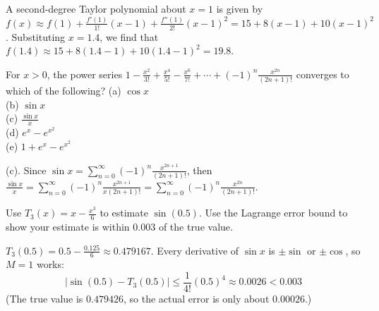 \begin{Answer}[ref=taylor2] A second-degree Taylor polynomial about $x = 1$ is given by $f(x) \approx f(1) 
+ \frac{f'(1)}{1!}(x - 1) + \frac{f''(1)}{2!}(x - 1)^2 = 15 + 8(x - 1) + 10(x 
- 1)^2$. Substituting $x = 1.4$, we find that $f(1.4) \approx 15 + 8(1.4 - 1) 
+ 10(1.4 - 1)^2 = 19.8$.
\end{Answer}

\begin{Exercise} For $x > 0$, the power series $1 - 
\frac{x^2}{3!} + \frac{x^4}{5!} - \frac{x^6}{7!} + \cdots + (-1)^n \frac{x^{2n}}{(2n + 1)!}$ converges to which of the following?
(a) $\cos{x}$\\
(b) $\sin{x}$\\
(c) $\frac{\sin{x}}{x}$\\
(d) $e^x - e^{x^2}$\\
(e) $1 + e^x - e^{x^2}$
\end{Exercise}

\begin{Answer}[ref=mac2] (c). Since $\sin{x} = \sum_{n=0}^\infty (-1)^n \frac{x^{2n + 1}}{(2n + 1)!}$, 
then $\frac{\sin{x}}{x} = \sum_{n = 0}^\infty (-1)^n \frac{x^{2n + 1}}{x(2n+1
)!} = \sum_{n=0}^\infty (-1)^n \frac{x^{2n}}{(2n + 1)!}$.
\end{Answer}



\begin{Exercise}[label = taylor3]
Use $T_3(x) = x - \frac{x^3}{6}$ to estimate $\sin(0.5)$. Use the Lagrange error
bound to show your estimate is within $0.003$ of the true value.
\end{Exercise}

\begin{Answer}[ref = taylor3]
$T_3(0.5) = 0.5 - \frac{0.125}{6} \approx 0.479167$. Every derivative of
$\sin x$ is $\pm\sin$ or $\pm\cos$, so $M = 1$ works:
$$|\sin(0.5) - T_3(0.5)| \leq \frac{1}{4!}(0.5)^4 \approx 0.0026 < 0.003$$
(The true value is $0.479426$, so the actual error is only about $0.00026$.)
\end{Answer}
